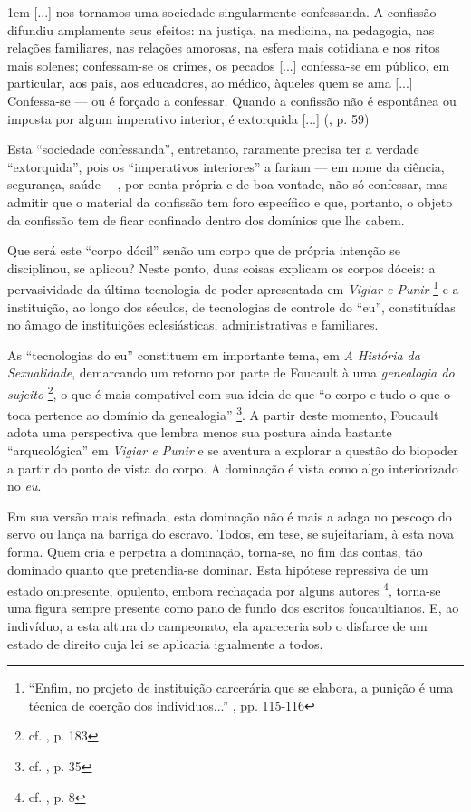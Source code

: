 \documentclass[12pt,a4paper]{article}
\newenvironment{citac}
{
	\begin{addmargin}
		[4cm]{1em} \footnotesize}{\normalfont 
	\end{addmargin}
}
\begin{document}
	\begin{citac}
		[...] nos tornamos uma sociedade singularmente confessanda. A 
		confissão difundiu amplamente seus efeitos: na justiça, na medicina, 
		na pedagogia, nas relações familiares, nas relações amorosas, na 
		esfera mais cotidiana e nos ritos mais solenes; confessam-se os crimes, 
		os pecados [...] confessa-se em público, em particular, aos pais, aos 
		educadores, ao médico, àqueles quem se ama [...] Confessa-se --- ou 
		é forçado a confessar. Quando a confissão não é espontânea ou imposta 
		por algum imperativo interior, é extorquida [...]
		(\cite{hs}, p. 59)		
	\end{citac}

	Esta ``sociedade confessanda'', entretanto, raramente precisa ter a 
	verdade ``extorquida'', pois os ``imperativos interiores'' a fariam 
	--- em nome da ciência, segurança, saúde ---, por conta própria e de 
	boa vontade, não só confessar, mas admitir que o material da confissão 
	tem foro específico e que, portanto, o objeto da confissão tem de ficar 
	confinado dentro dos domínios que lhe cabem. 
	
	Que será este ``corpo dócil'' senão um corpo que de própria intenção se 
	disciplinou, se aplicou? Neste ponto, duas coisas explicam os corpos 
	dóceis: a pervasividade da última tecnologia de poder apresentada em 
	\textit{Vigiar e Punir}
	\footnote{``Enfim, no projeto de instituição carcerária que se elabora, 
	a punição é uma técnica de coerção dos indivíduos...'' 
	\cite{foucault}, pp. 115-116}
	e a instituição, ao longo dos séculos, de tecnologias de controle do 
	``eu'', constituídas no âmago de instituições eclesiásticas, 
	administrativas e familiares. 
	
	As ``tecnologias do eu'' constituem em importante tema, em \textit{A 
	História da Sexualidade}, demarcando um retorno por parte de Foucault 
	à uma \emph{genealogia do sujeito}
		\footnote{cf. \cite{merquior}, p. 183}, 
	o que é mais compatível com sua ideia de que ``o corpo e tudo o que 
	o toca pertence ao domínio da genealogia''
		\footnote{cf. \cite{map}, p. 35}. 
	A partir deste momento, Foucault adota uma perspectiva que lembra menos 
	sua postura ainda bastante ``arqueológica'' em \textit{Vigiar e Punir} 
	e se aventura a explorar a questão do biopoder a partir do ponto de 
	vista do corpo. A dominação é vista como algo interiorizado no \emph{eu}. 
	
	Em sua versão mais refinada, esta dominação não é mais a adaga no pescoço 
	do servo ou lança na barriga do escravo. Todos, em tese, se sujeitariam, 
	à esta nova forma. Quem cria e perpetra a dominação, torna-se, no fim das 
	contas, tão dominado quanto que pretendia-se dominar. Esta hipótese 
	repressiva de um estado onipresente, opulento, embora rechaçada por alguns 
	autores
		\footnote{cf. \cite{lebrun}, p. 8}, 
	torna-se uma figura sempre presente como pano de fundo dos escritos 
	foucaultianos. E, ao indivíduo, a esta altura do campeonato, ela 
	apareceria sob o disfarce de um estado de direito cuja lei se aplicaria 
	igualmente a todos. 
	
\end{document}
